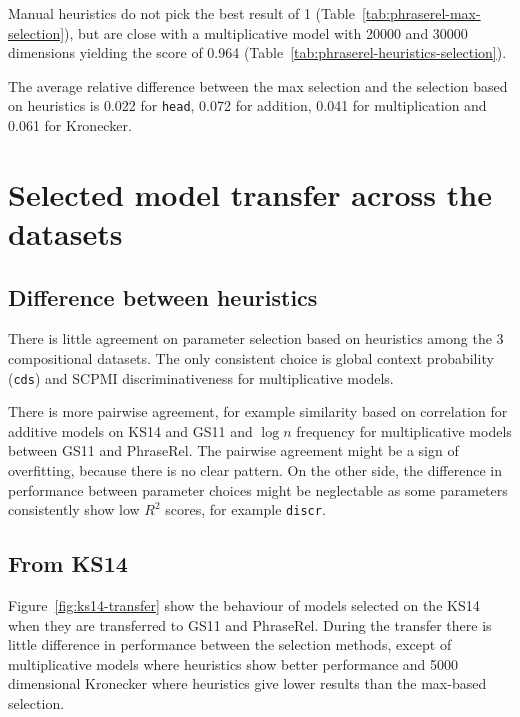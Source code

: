 Manual heuristics do not pick the best result of 1 (Table~\ref{tab:phraserel-max-selection}), but are close with a multiplicative model with 20000 and 30000 dimensions yielding the score of 0.964 (Table~\ref{tab:phraserel-heuristics-selection}).

The average relative difference between the max selection and the selection based on heuristics is 0.022 for \texttt{head}, 0.072 for addition, 0.041 for multiplication and 0.061 for Kronecker.

\section{Selected model transfer across the datasets}
\label{sec:select-model-transf-comp}

\subsection{Difference between heuristics}
\label{sec:diff-betw-heur-comp}

There is little agreement on parameter selection based on heuristics among the 3 compositional datasets. The only consistent choice is global context probability (\texttt{cds}) and SCPMI discriminativeness for multiplicative models.

There is more pairwise agreement, for example similarity based on correlation for additive models on KS14 and GS11 and $\log n$ frequency for multiplicative models between GS11 and PhraseRel. The pairwise agreement might be a sign of overfitting, because there is no clear pattern. On the other side, the difference in performance between parameter choices might be neglectable as some parameters consistently show low $R^2$ scores, for example \texttt{discr}.

\subsection{From KS14}
\label{sec:from-ks14}



Figure~\ref{fig:ks14-transfer} show the behaviour of models selected on the KS14 when they are transferred to GS11 and PhraseRel. During the transfer there is little difference in performance between the selection methods, except of multiplicative models where heuristics show better performance and 5000 dimensional Kronecker where heuristics give lower results than the max-based selection.

